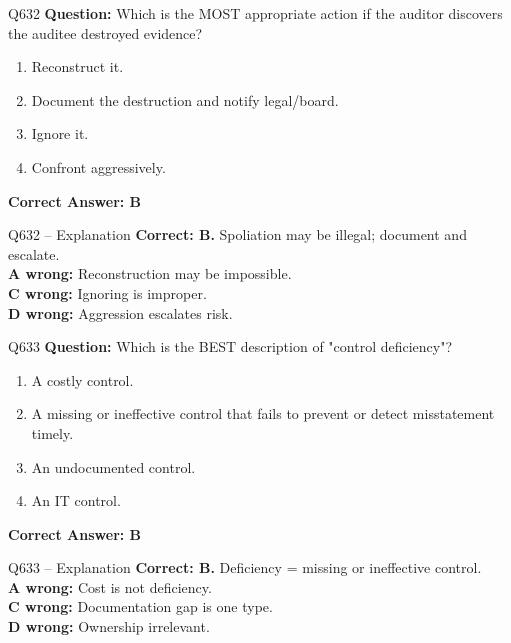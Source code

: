 \documentclass[aspectratio=169,10pt]{beamer}
\begin{document}
	\begin{frame}[t]{Q632}
		\small
		\textbf{Question:} Which is the MOST appropriate action if the auditor discovers the auditee destroyed evidence?
		\begin{enumerate}[label=\Alph*.,itemsep=1pt,topsep=2pt]
			\item Reconstruct it.
			\item Document the destruction and notify legal/board.
			\item Ignore it.
			\item Confront aggressively.
		\end{enumerate}
		\vspace{4pt}
		\textbf{Correct Answer: B}
	\end{frame}
	
	\begin{frame}[t]{Q632 -- Explanation}
		\small
		\textbf{Correct: B.} Spoliation may be illegal; document and escalate. \\[4pt]
		\textbf{A wrong:} Reconstruction may be impossible. \\[2pt]
		\textbf{C wrong:} Ignoring is improper. \\[2pt]
		\textbf{D wrong:} Aggression escalates risk.
	\end{frame}
	
	\begin{frame}[t]{Q633}
		\small
		\textbf{Question:} Which is the BEST description of "control deficiency"?
		\begin{enumerate}[label=\Alph*.,itemsep=1pt,topsep=2pt]
			\item A costly control.
			\item A missing or ineffective control that fails to prevent or detect misstatement timely.
			\item An undocumented control.
			\item An IT control.
		\end{enumerate}
		\vspace{4pt}
		\textbf{Correct Answer: B}
	\end{frame}
	
	\begin{frame}[t]{Q633 -- Explanation}
		\small
		\textbf{Correct: B.} Deficiency = missing or ineffective control. \\[4pt]
		\textbf{A wrong:} Cost is not deficiency. \\[2pt]
		\textbf{C wrong:} Documentation gap is one type. \\[2pt]
		\textbf{D wrong:} Ownership irrelevant.
	\end{frame}
	
\end{document}
